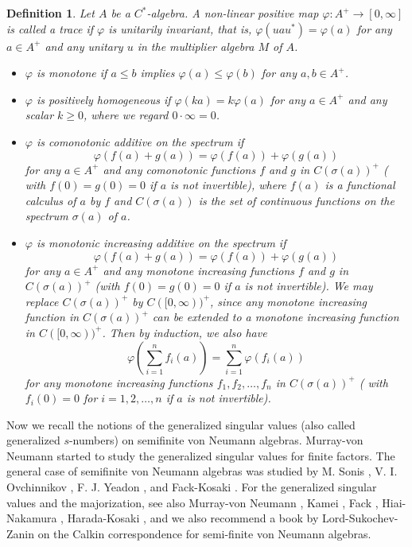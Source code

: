 \documentclass[a4paper,12pt]{amsart}
\newtheorem{definition}{Definition}[section]
\begin{document}
\begin{definition}  \rm Let $A$ be a $C^*$-algebra.  A non-linear positive map 
$\varphi : A^+ \rightarrow  [0, \infty]$ is called a {\it trace} if 
$\varphi$ is unitarily invariant, that is, 
$\varphi(uau^*) = \varphi(a)$ for any $a \in A^+$ and any unitary 
$u$ in the multiplier algebra $M$ of $A$.  
\begin{itemize}
  \item  $\varphi$ is {\it monotone} if 
$a \leq b$ implies  $\varphi(a) \leq  \varphi(b)$ for any $a,b \in  A^+$. 
  \item  $\varphi$ is {\it positively homogeneous} if 
$\varphi(ka) = k\varphi(a)$ for any $a \in A^+$ and any  scalar $k \geq 0$, 
where we regard $0 \cdot \infty = 0$. 
  \item $\varphi$ is {\it comonotonic additive on the spectrum} if 
$$
\varphi(f(a)  + g(a)) = \varphi(f(a)) + \varphi(g(a)) 
$$  
for any $a \in A^+$ and 
any comonotonic functions $f$ and $g$  in $C(\sigma(a))^+$ ( with $f(0) = g(0) = 0$ if $a$ is not invertible), where 
$f(a)$ is a functional calculus of $a$ by $f$ and  $C(\sigma(a))$ is 
the set of continuous functions on the spectrum $\sigma(a)$ of $a$. 
  \item $\varphi$ is {\it monotonic increasing additive on the spectrum} if 
$$
\varphi(f(a)  + g(a)) = \varphi(f(a)) + \varphi(g(a))
$$  
for any $a \in A^+$ and 
any monotone increasing functions $f$ and $g$  in $C(\sigma(a))^+$ (with $f(0)=g(0)=0$ if $a$ is not invertible). 
We may replace $C(\sigma(a))^+$ by $C([0,\infty))^+$, since any monotone increasing function in $C(\sigma(a))^+$ 
can be extended to a monotone increasing function in $C([0,\infty))^+$.  
Then by induction, 
we also have 
$$
 \varphi(\sum_{i=1}^n f_i(a)) = \sum_{i=1}^n \varphi (f_i(a))
$$
for any monotone increasing functions $f_1, f_2, \dots, f_n$ in  $C(\sigma(a))^+$  ( with  $f_i(0) = 0$ for $i=1,2,\ldots, n$ if 
$a$ is not invertible). 
\end{itemize}
\end{definition}



Now we  recall the notions of the generalized singular values (also called generalized $s$-numbers) 
on semifinite von Neumann algebras. 
Murray-von Neumann \cite{murrayvonneumann} started to study the generalized singular values 
for finite factors. The general case of semifinite von Neumann algebras was studied by M. Sonis  \cite{sonis}, 
V. I. Ovchinnikov \cite{ovchinnikov}, F. J. Yeadon \cite{yeason}, and Fack-Kosaki \cite{F-K}.
For the generalized singular values  and the majorization, see also Murray-von Neumann \cite{murrayvonneumann}, 
Kamei \cite{kamei}, Fack \cite{F}, Hiai-Nakamura \cite{H-N2}, Harada-Kosaki \cite{H-K}, \cite{K-S} and we also recommend a book \cite{L-S-Z} by Lord-Sukochev-Zanin on the Calkin correspondence for semi-finite von Neumann algebras. 
\end{document}
